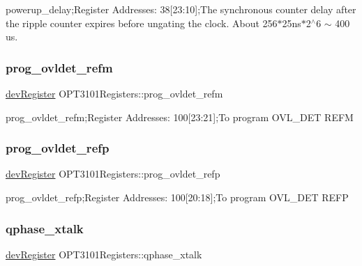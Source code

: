 powerup\+\_\+delay;Register Addresses\+: 38\mbox{[}23\+:10\mbox{]};The synchronous counter delay after the ripple counter expires before ungating the clock. About 256$\ast$25ns$\ast$2$^\wedge$6 $\sim$ 400 us. 

\mbox{\label{class_o_p_t3101_registers_ac2bb471d2455d0fb9a96a368003f7f59}} 
\subsubsection{\texorpdfstring{prog\+\_\+ovldet\+\_\+refm}{prog\_ovldet\_refm}}
{\footnotesize\ttfamily \mbox{\hyperlink{classdev_register}{dev\+Register}} O\+P\+T3101\+Registers\+::prog\+\_\+ovldet\+\_\+refm}



prog\+\_\+ovldet\+\_\+refm;Register Addresses\+: 100\mbox{[}23\+:21\mbox{]};To program O\+V\+L\+\_\+\+D\+ET R\+E\+FM 

\mbox{\label{class_o_p_t3101_registers_ac41346a3341dc33f7085fbaa56947ad6}} 
\subsubsection{\texorpdfstring{prog\+\_\+ovldet\+\_\+refp}{prog\_ovldet\_refp}}
{\footnotesize\ttfamily \mbox{\hyperlink{classdev_register}{dev\+Register}} O\+P\+T3101\+Registers\+::prog\+\_\+ovldet\+\_\+refp}



prog\+\_\+ovldet\+\_\+refp;Register Addresses\+: 100\mbox{[}20\+:18\mbox{]};To program O\+V\+L\+\_\+\+D\+ET R\+E\+FP 

\mbox{\label{class_o_p_t3101_registers_ad4347824ee5afdbdbe01e5043faca95c}} 
\subsubsection{\texorpdfstring{qphase\+\_\+xtalk}{qphase\_xtalk}}
{\footnotesize\ttfamily \mbox{\hyperlink{classdev_register}{dev\+Register}} O\+P\+T3101\+Registers\+::qphase\+\_\+xtalk}



